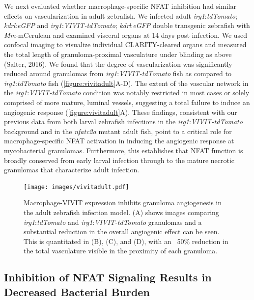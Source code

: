 We next evaluated whether macrophage\hyp{}specific NFAT inhibition had similar effects on vascularization in adult zebrafish. We infected adult \textit{irg1}:\textit{tdTomato}; \textit{kdrl}:\textit{eGFP} and \textit{irg1}:\textit{VIVIT\hyp{}tdTomato}; \textit{kdrl}:\textit{eGFP} double transgenic zebrafish with \textit{Mm}\hyp{}mCerulean and examined visceral organs at 14 days post infection. We used confocal imaging to visualize individual CLARITY\hyp{}cleared organs and measured the total length of granuloma\hyp{}proximal vasculature under blinding as above (Salter, 2016). We found that the degree of vascularization was significantly reduced around granulomas from \textit{irg1}:\textit{VIVIT\hyp{}tdTomato} fish as compared to \textit{irg1}:\textit{tdTomato} fish (\autoref{figure:vivitadult}A\hyp{}D). The extent of the vascular network in the \textit{irg1}:\textit{VIVIT\hyp{}tdTomato} condition was notably restricted in most cases or solely comprised of more mature, luminal vessels, suggesting a total failure to induce an angiogenic response (\autoref{figure:vivitadult}A). These findings, consistent with our previous data from both larval zebrafish infections in the \textit{irg1}:\textit{VIVIT\hyp{}tdTomato} background and in the \textit{nfatc2a} mutant adult fish, point to a critical role for macrophage\hyp{}specific NFAT activation in inducing the angiogenic response at mycobacterial granulomas. Furthermore, this establishes that NFAT function is broadly conserved from early larval infection through to the mature necrotic granulomas that characterize adult infection.

\begin{figure}
\centering
\texttt{[image: images/vivitadult.pdf]}
\caption{Macrophage\hyp{}VIVIT expression inhibits granuloma angiogenesis in the adult zebrafish infection model. (A) shows images comparing \textit{irg1}:\textit{tdTomato} and \textit{irg1}:\textit{VIVIT\hyp{}tdTomato} granulomas and a substantial reduction in the overall angiogenic effect can be seen. This is quantitated in (B), (C), and (D), with an ~50\% reduction in the total vasculature visible in the proximity of each granuloma.}
\label{figure:vivitadult}
\end{figure}

\subsection{Inhibition of NFAT Signaling Results in Decreased Bacterial Burden}

